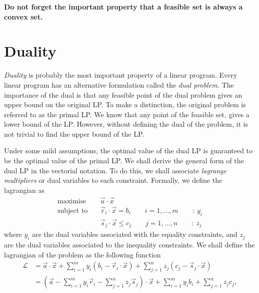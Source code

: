 \textbf{Do not forget the important property that a feasible set is always a convex set.}

\section{Duality}
\textit{Duality} is probably the most important property of a linear program. Every linear program has an alternative formulation called the \textit{dual problem.}
The importance of the dual is that any feasible point of the dual problem gives an upper bound on the original LP. To make a distinction, the original problem is referred to as the primal LP.
We know that any point of the feasible set, gives a lower bound of the LP. However, without defining the dual of the problem, it is not trivial to find the upper bound of the LP.

Under some mild assumptions, the optimal value of the dual LP is guaranteed to be the optimal value of the primal LP.
We shall derive the general form of the dual LP in the vectorial notation. To do this, we shall associate \textit{lagrange multipliers} or dual variables to each constraint. Formally,
we define the lagrangian as
\[
    \begin{aligned}
        \text{maximise} \quad & \vec{a}\cdot\vec{x}             \\[1em]
        \text{subject to} \quad
                              & \vec{r}_i \cdot \vec{x} = b_i
        \qquad i = 1,\ldots,m
        \qquad :\ y_i                                           \\[0.8em]
                              & \vec{s}_j \cdot \vec{x} \le c_j
        \qquad j = 1,\ldots,n
        \qquad :\ z_j
    \end{aligned}
\]
where $y_i$ are the dual variables associated with the equality constraints, and $z_j$ are the dual variables associated to the inequality constraints.
We shall define the lagrangian of the problem as the following function
\begin{align}
    \mathcal{L}
     & =
    \vec{a}\cdot\vec{x}
    +
    \sum_{i=1}^{m}
    y_i
    \left(
    b_i-\vec{r}_i\cdot\vec{x}
    \right)
    +
    \sum_{j=1}^{n}
    z_j
    \left(
    c_j-\vec{s}_j\cdot\vec{x}
    \right)
    \tag{1.27a}
    \label{eq:lagrangian1}
    \\[1.5em]
     & =
    \left(
    \vec{a}
    -
    \sum_{i=1}^{m} y_i \vec{r}_i
    -
    \sum_{j=1}^{n} z_j \vec{s}_j
    \right)
    \cdot
    \vec{x}
    +
    \sum_{i=1}^{m} y_i b_i
    +
    \sum_{j=1}^{n} z_j c_j,
    \tag{1.27b}
    \label{eq:lagrangian2}
\end{align}

